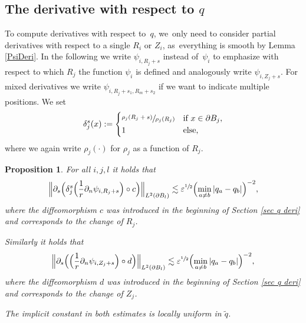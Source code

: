 \documentclass[JEP,XML,SOM,Unicode,published]{cedram}
\let\epsilon\varepsilon
\newtheorem{proposition}[theorem]{Proposition}
\theoremstyle{definition}
\newcommand\Bnorm[1]{\Bigl\lVert #1\Bigr\rVert}
\let\de\partial
\let\eps\epsilon
\begin{document}
\subsection{The derivative with respect to $q$}
To compute derivatives with respect to~$q$, we~only need to consider partial derivatives with respect to a single $R_i$ or $Z_i$, as~everything is smooth by Lemma \ref{PsiDeri}.
In the following we write $\psi_{i,R_j+s}$ instead of~$\psi_i$ to emphasize with respect to which $R_j$ the function $\psi_i$ is defined and analogously write $\psi_{i,Z_j+s}$. For mixed derivatives we write $\psi_{i,R_j+s_1,R_m+s_2}$ if we want to indicate multiple positions.
We set
\begin{align*}
\delta_{j}^s(x):=\begin{cases}
\sfrac{\rho_j(R_j+s)}{\rho_j(R_j)}& \text{if } x\in \de B_j,\\
1 & \text{else,}
\end{cases}
\end{align*}
where we again write $\rho_j(\cdot)$ for $\rho_j$ as a function of $R_j$.

\begin{proposition}\label{deri mu}
For all $i,j,l$ it holds that
\begin{align*}
\Bnorm{\de_s\Bigl(\delta_j^s\Bigl(\frac{1}{r}\de_n\psi_{i,R_j+s}\Bigr)\circ c\Bigr)}_{L^2(\de B_l)}\lesssim \eps^{\sfrac{1}{2}}\Bigl(\min_{a\neq b}|q_a-q_b|\Bigr)^{-2},
\end{align*}
where the diffeomorphism $c$ was introduced in the beginning of Section \ref{sec q deri} and corresponds to the change of $R_j$.

Similarly it holds that
\begin{align*}
\Bnorm{\de_s\Bigl(\Bigl(\frac{1}{r}\de_n\psi_{i,Z_j+s}\Bigr)\circ d\Bigr)}_{L^2(\de B_l)}\lesssim \eps^{\sfrac{1}{2}}\Bigl(\min_{a\neq b}|q_a-q_b|\Bigr)^{-2},
\end{align*}
where the diffeomorphism $d$ was introduced in the beginning of Section \ref{sec q deri} and corresponds to the change of $Z_j$.

The implicit constant in both estimates is locally uniform in $\tilde{q}$.
\end{proposition}
\end{document}
